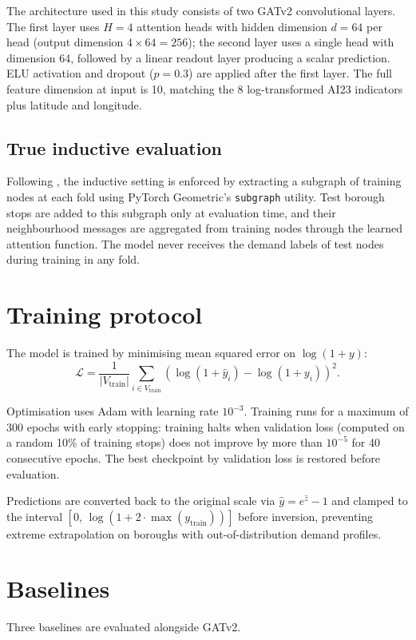 \documentclass[12pt,a4paper]{report}
\begin{document}
The architecture used in this study consists of two GATv2 convolutional layers.
The first layer uses $H=4$ attention heads with hidden dimension $d=64$ per
head (output dimension $4 \times 64 = 256$); the second layer uses a single
head with dimension 64, followed by a linear readout layer producing a scalar
prediction. ELU activation and dropout ($p=0.3$) are applied after the first
layer. The full feature dimension at input is 10, matching the 8 log-transformed
AI23 indicators plus latitude and longitude.

\subsection{True inductive evaluation}
Following \citet{hamilton2017inductive}, the inductive setting is enforced by
extracting a subgraph of training nodes at each fold using PyTorch Geometric's
\texttt{subgraph} utility. Test borough stops are added to this subgraph only
at evaluation time, and their neighbourhood messages are aggregated from
training nodes through the learned attention function. The model never receives
the demand labels of test nodes during training in any fold.

\section{Training protocol}
The model is trained by minimising mean squared error on $\log(1+y)$:
\begin{equation}
  \mathcal{L} = \frac{1}{|V_{\text{train}}|} \sum_{i \in V_{\text{train}}}
  \left(\log(1 + \hat{y}_i) - \log(1 + y_i)\right)^2.
\end{equation}

Optimisation uses Adam \citep{kingma2015adam} with learning rate $10^{-3}$.
Training runs for a maximum of 300 epochs with early stopping: training halts
when validation loss (computed on a random 10\% of training stops) does not
improve by more than $10^{-5}$ for 40 consecutive epochs. The best checkpoint
by validation loss is restored before evaluation.

Predictions are converted back to the original scale via $\hat{y} = e^{\hat{z}} - 1$
and clamped to the interval $[0,\, \log(1 + 2 \cdot \max(y_{\text{train}}))]$
before inversion, preventing extreme extrapolation on boroughs with
out-of-distribution demand profiles.

\section{Baselines}
Three baselines are evaluated alongside GATv2.
\end{document}
